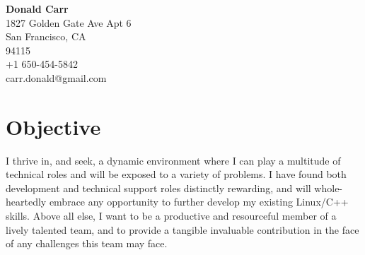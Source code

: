 \documentclass{article}
\begin{document}

\begin{center}
\textbf{Donald Carr}\\
1827 Golden Gate Ave Apt 6\\
San Francisco, CA \\
94115 \\
+1 650-454-5842 \\
carr.donald@gmail.com \\
\end{center}

\section*{Objective}

I thrive in, and seek, a dynamic environment where I can play a multitude of technical roles and will be exposed to a variety of problems. I have found both development and technical support roles distinctly rewarding, and will whole-heartedly embrace any opportunity to further develop my existing Linux/C++ skills. Above all else, I want to be a productive and resourceful member of a lively talented team, and to provide a tangible invaluable contribution in the face of any challenges this team may face.
\end{document}
